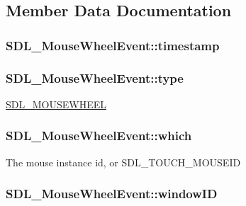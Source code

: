 \subsection{Member Data Documentation}
\hypertarget{struct_s_d_l___mouse_wheel_event_a83ad52c80ff49a8e75dc6c33bba65fa0}{
\subsubsection[{timestamp}]{ S\-D\-L\-\_\-\-Mouse\-Wheel\-Event\-::timestamp}}\label{struct_s_d_l___mouse_wheel_event_a83ad52c80ff49a8e75dc6c33bba65fa0}
\hypertarget{struct_s_d_l___mouse_wheel_event_aa6b741e99df708c6f9550ee0f520fb70}{
\subsubsection[{type}]{ S\-D\-L\-\_\-\-Mouse\-Wheel\-Event\-::type}}\label{struct_s_d_l___mouse_wheel_event_aa6b741e99df708c6f9550ee0f520fb70}
\hyperlink{_s_d_l__events_8h_a3b589e89be6b35c02e0dd34a55f3fccaa63135c2e0aea2286f05066f3c0bc5c4e}{S\-D\-L\-\_\-\-M\-O\-U\-S\-E\-W\-H\-E\-E\-L} \hypertarget{struct_s_d_l___mouse_wheel_event_a014dc767d52e8b75ba26a5f12e1704e8}{
\subsubsection[{which}]{ S\-D\-L\-\_\-\-Mouse\-Wheel\-Event\-::which}}\label{struct_s_d_l___mouse_wheel_event_a014dc767d52e8b75ba26a5f12e1704e8}
The mouse instance id, or S\-D\-L\-\_\-\-T\-O\-U\-C\-H\-\_\-\-M\-O\-U\-S\-E\-I\-D \hypertarget{struct_s_d_l___mouse_wheel_event_ab45eb1895217214ecb773fc555e08f6c}{
\subsubsection[{window\-I\-D}]{ S\-D\-L\-\_\-\-Mouse\-Wheel\-Event\-::window\-I\-D}}\label{struct_s_d_l___mouse_wheel_event_ab45eb1895217214ecb773fc555e08f6c}
